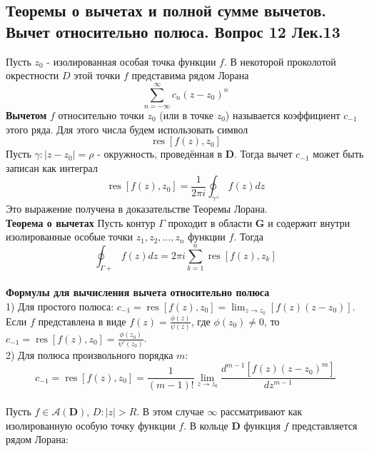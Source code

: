\documentclass{article}
\begin{document}
\subsection{Теоремы о вычетах и полной сумме вычетов. Вычет относительно полюса. Вопрос 12 Лек.13}
	Пусть ${z}_{0}$ - изолированная особая точка функции $ f $. В некоторой проколотой окрестности $D$ этой точки $ f $ представима рядом Лорана
	\begin{equation}
	\sum_{n=-\infty}^{\infty} c_{n}\left(z-z_{0}\right)^{n}
	\end{equation}
	\textbf{Вычетом} $ f $ относительно точки $ z_{0}$ (или в точке $z_{0}$) называется коэффициент $ c_{-1} $ этого ряда. Для этого числа будем использовать символ
	\begin{equation}
	\operatorname{res}\left[f(z), z_{0}\right]
	\end{equation}
	Пусть $ \gamma:\left|z-z_{0}\right|=\rho$ - окружность, проведённая в $ \mathbf{D} $. Тогда вычет $ c_{-1}$ может быть записан как интеграл 
	\begin{equation}
	\operatorname{res}\left[f(z), z_{0}\right]=\frac{1}{2 \pi i} \oint_{\gamma^{+}} f(z) d z
	\end{equation}
	Это выражение получена в доказательстве Теоремы Лорана.\\
	\textbf{Теорема о вычетах} Пусть контур $\Gamma$ проходит в области $\mathbf{G}$ и содержит внутри изолированные особые точки $ z_{1}, z_{2}, \ldots, z_{n} $ функции $ f $. Тогда
	\begin{equation}
	\oint_{\Gamma+} f(z) d z=2 \pi i \sum_{k=1}^{n} \operatorname{res}\left[f(z), z_{k}\right]
	\end{equation}
	\\
	\textbf{Формулы для вычисления вычета относительно полюса}\\
	1) Для простого полюса: ${c}_{-1}=\operatorname{res}\left[f(z), z_{0}\right]=\lim_{z \rightarrow z_{0}}[f(z)(z-{z}_{0})]$. Если $f$ представлена в виде $f(z)=\frac{\phi(z)}{\psi(z)}$, где $\phi({z}_{0})\ne 0$, то ${c}_{-1}=\operatorname{res}[f(z), z_{0}]=\frac{\phi({z}_{0})}{\psi'({z}_{0})}$.\\
	2) Для полюса произвольного порядка $m$:
	\begin{equation}
	c_{-1}=\operatorname{res}\left[f(z), z_{0}\right]=\frac{1}{(m-1) !} \lim _{z \rightarrow z_{0}} \frac{d^{m-1}\left[f(z)\left(z-z_{0}\right)^{m}\right]}{d z^{m-1}}
	\end{equation} 
	\\
	Пусть $f\in \mathcal{A}(\mathbf{D})$, $ D:  |z|>R $. В этом случае $ \infty $ рассматривают как изолированную особую точку функции $ f $. В кольце $ \mathbf{D}$ функция $ f $ представляется рядом Лорана:
\end{document}
